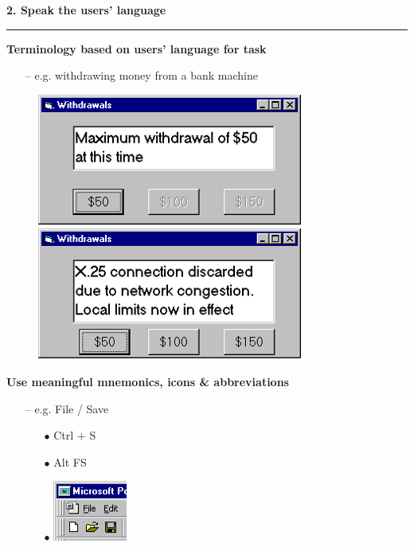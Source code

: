 \documentclass[pdf]{beamer}
\begin{document}
\begin{frame}
{\textbf{2. Speak the users' language}}{\textcolor{red}{\rule{12cm}{1.2pt}}}

\textbf{Terminology based on users' language for task}
\begin{itemize}
\item [--] e.g. withdrawing money from a bank machine
\end{itemize}

\begin{figure}[H]  
  \begin{minipage}[b]{0.4\linewidth}
    \includegraphics[width=.7\linewidth]{14_Picture1.png}  
  \end{minipage} 
  \begin{minipage}[b]{0.4\linewidth}
    \includegraphics[width=0.7\linewidth]{14_Picture2.png} 
  \end{minipage} 
\end{figure}

\textbf{Use meaningful mnemonics, icons \& abbreviations}

\begin{itemize}
	\item [--]e.g. File / Save
	\begin{itemize}
		\item [$\bullet$]Ctrl + S   \hspace{60px}{(abreviation)}
		\item[$\bullet$]Alt FS  
        \hspace{67px}{(mnemonic for menu action)}
		\item[$\bullet$] 
        \includegraphics[width=.1\linewidth]{14_Picture3.png} \hspace{67px}{(tooltip  icon)}
	\end{itemize}
\end{itemize}
\end{frame}
\end{document}
